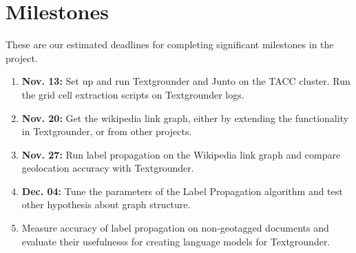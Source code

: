 \section{Milestones}
These are our estimated deadlines for completing significant milestones in the project.
\begin{enumerate}
    \item \textbf{Nov. 13:} Set up and run Textgrounder and Junto on the TACC cluster. Run the grid cell extraction scripts on Textgrounder logs.
    \item \textbf{Nov. 20:} Get the wikipedia link graph, either by extending the functionality in Textgrounder, or from other projects.
    \item \textbf{Nov. 27:} Run label propagation on the Wikipedia link graph and compare geolocation accuracy with Textgrounder.
    \item \textbf{Dec. 04:} Tune the parameters of the Label Propagation algorithm and test other hypothesis about graph structure.
    \item Measure accuracy of label propagation on non-geotagged documents and evaluate their usefulnesss for creating language models for Textgrounder.
\end{enumerate}
